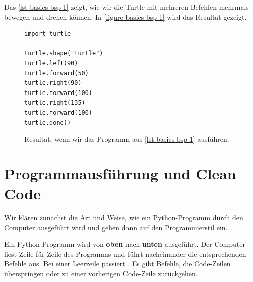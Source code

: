 \begin{example}

Das \autoref{lst-basics-bsp-1} zeigt, wie wir die Turtle mit mehreren Befehlen mehrmals bewegen und drehen können. In \autoref{figure-basics-bsp-1} wird das Resultat gezeigt.

\begin{figure}[htb]
\centering
\begin{minipage}{0.5\linewidth}
\centering
\begin{lstlisting}[caption={Beispielprogramm, welches die Figur aus \autoref{figure-basics-bsp-1} zeichnet (\graybgtexttt{bsp\_1.py}).}, label=lst-basics-bsp-1, showspaces=true]
import turtle

turtle.shape("turtle")
turtle.left(90)
turtle.forward(50)
turtle.right(90)
turtle.forward(100)
turtle.right(135)
turtle.forward(100)
turtle.done()
\end{lstlisting}
\end{minipage}
\hfill
\begin{minipage}[c]{0.4\linewidth}
\centering
{}
\caption{Resultat, wenn wir das Programm aus \autoref{lst-basics-bsp-1} ausführen.}
\label{figure-basics-bsp-1}
\end{minipage}
\end{figure}

\end{example}

\section{Programmausführung und Clean Code}

Wir klären zunächst die Art und Weise, wie ein Python-Programm durch den Computer ausgeführt wird und gehen dann auf den Programmierstil ein.

\begin{definition}[Programmausführung]
Ein Python-Programm wird von \textbf{oben} nach \textbf{unten} ausgeführt. Der Computer liest Zeile für Zeile des Programms und führt nacheinander die entsprechenden Befehle aus. Bei einer Leerzeile passiert . Es gibt Befehle, die Code-Zeilen überspringen oder zu einer vorherigen Code-Zeile zurückgehen.
\end{definition}

